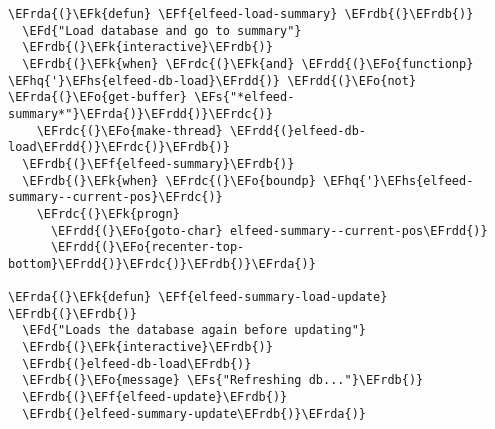 \documentclass[a4wide,10pt]{article}
\newcommand{\EFs}[1]{\textcolor{EFs}{#1}} %
\newcommand{\EFd}[1]{\textcolor{EFd}{#1}} %
\newcommand{\EFk}[1]{\textcolor{EFk}{#1}} %
\newcommand{\EFf}[1]{\textcolor{EFf}{#1}} %
\newcommand{\EFo}[1]{\textcolor{EFo}{#1}} %
\newcommand{\EFhq}[1]{\textcolor{EFhq}{#1}} %
\newcommand{\EFhs}[1]{\textcolor{EFhs}{#1}} %
\newcommand{\EFrda}[1]{\textcolor{EFrda}{#1}} %
\newcommand{\EFrdb}[1]{\textcolor{EFrdb}{#1}} %
\newcommand{\EFrdc}[1]{\textcolor{EFrdc}{#1}} %
\newcommand{\EFrdd}[1]{\textcolor{EFrdd}{#1}} %
\begin{document}
\begin{Code}
\begin{Verbatim}
\EFrda{(}\EFk{defun} \EFf{elfeed-load-summary} \EFrdb{(}\EFrdb{)}
  \EFd{"Load database and go to summary"}
  \EFrdb{(}\EFk{interactive}\EFrdb{)}
  \EFrdb{(}\EFk{when} \EFrdc{(}\EFk{and} \EFrdd{(}\EFo{functionp} \EFhq{'}\EFhs{elfeed-db-load}\EFrdd{)} \EFrdd{(}\EFo{not} \EFrda{(}\EFo{get-buffer} \EFs{"*elfeed-summary*"}\EFrda{)}\EFrdd{)}\EFrdc{)}
    \EFrdc{(}\EFo{make-thread} \EFrdd{(}elfeed-db-load\EFrdd{)}\EFrdc{)}\EFrdb{)}
  \EFrdb{(}\EFf{elfeed-summary}\EFrdb{)}
  \EFrdb{(}\EFk{when} \EFrdc{(}\EFo{boundp} \EFhq{'}\EFhs{elfeed-summary--current-pos}\EFrdc{)}
    \EFrdc{(}\EFk{progn}
      \EFrdd{(}\EFo{goto-char} elfeed-summary--current-pos\EFrdd{)}
      \EFrdd{(}\EFo{recenter-top-bottom}\EFrdd{)}\EFrdc{)}\EFrdb{)}\EFrda{)}

\EFrda{(}\EFk{defun} \EFf{elfeed-summary-load-update} \EFrdb{(}\EFrdb{)}
  \EFd{"Loads the database again before updating"}
  \EFrdb{(}\EFk{interactive}\EFrdb{)}
  \EFrdb{(}elfeed-db-load\EFrdb{)}
  \EFrdb{(}\EFo{message} \EFs{"Refreshing db..."}\EFrdb{)}
  \EFrdb{(}\EFf{elfeed-update}\EFrdb{)}
  \EFrdb{(}elfeed-summary-update\EFrdb{)}\EFrda{)}


\end{Verbatim}
\end{Code}
\end{document}
